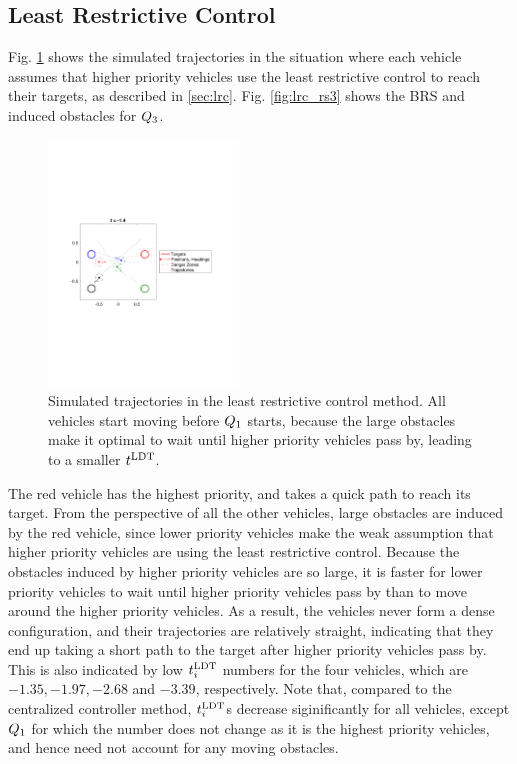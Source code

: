 \subsection{Least Restrictive Control}
Fig. \ref{fig:lrc_traj} shows the simulated trajectories in the situation where each vehicle assumes that higher priority vehicles use the least restrictive control to reach their targets, as described in \ref{sec:lrc}. Fig. \ref{fig:lrc_rs3} shows the BRS and induced obstacles for $Q_3$.

\begin{figure}
  \centering
  \includegraphics[width=0.45\textwidth]{"fig/lrc_traj"}
  \caption{Simulated trajectories in the least restrictive control method. All vehicles start moving before $Q_1$ starts, because the large obstacles make it optimal to wait until higher priority vehicles pass by, leading to a smaller $t^\text{LDT}$. }
  \label{fig:lrc_traj}
\end{figure}

The red vehicle has the highest priority, and takes a quick path to reach its target. From the perspective of all the other vehicles, large obstacles are induced by the red vehicle, since lower priority vehicles make the weak assumption that higher priority vehicles are using the least restrictive control. Because the obstacles induced by higher priority vehicles are so large, it is faster for lower priority vehicles to wait until higher priority vehicles pass by than to move around the higher priority vehicles. As a result, the vehicles never form a dense configuration, and their trajectories are relatively straight, indicating that they end up taking a short path to the target after higher priority vehicles pass by. This is also indicated by low $t^\text{LDT}_i$ numbers for the four vehicles, which are $-1.35, -1.97, -2.68$ and $-3.39$, respectively. Note that, compared to the centralized controller method, $t^\text{LDT}_i$s decrease siginificantly for all vehicles, except $Q_1$ for which the number does not change as it is the highest priority vehicles, and hence need not account for any moving obstacles. 

